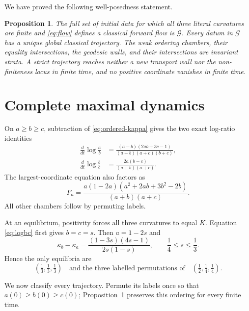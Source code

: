 \documentclass[11pt]{article}
\newtheorem{proposition}[theorem]{Proposition}
\theoremstyle{remark}
\newcommand{\G}{\mathcal G}
\begin{document}
We have proved the following well-posedness statement.

\begin{proposition}\label{prop:wellposed}
The full set of initial data for which all three literal curvatures are finite
and \eqref{eq:flow} defines a classical forward flow is $\G$.  Every datum in
$\G$ has a unique global classical trajectory.  The weak ordering chambers,
their equality intersections, the geodesic walls, and their intersections
are invariant strata.  A strict trajectory reaches neither a new transport
wall nor the non-finiteness locus in finite time, and no positive coordinate
vanishes in finite time.
\end{proposition}

\section{Complete maximal dynamics}

On $a\geq b\geq c$, subtraction of \eqref{eq:ordered-kappa} gives the two
exact log-ratio identities
\begin{align}
 \frac{d}{dt}\log\frac ab
 &=\frac{(a-b)(2ab+3c-1)}{(a+b)(a+c)(b+c)},\label{eq:logab}\\
 \frac{d}{dt}\log\frac bc
 &=\frac{2a(b-c)}{(a+b)(a+c)}.\label{eq:logbc}
\end{align}
The largest-coordinate equation also factors as
\begin{equation}\label{eq:Fa}
 F_a=\frac{a(1-2a)(a^2+2ab+3b^2-2b)}{(a+b)(a+c)}.
\end{equation}
All other chambers follow by permuting labels.

At an equilibrium, positivity forces all three curvatures to equal $K$.
Equation \eqref{eq:logbc} first gives $b=c=s$.  Then $a=1-2s$ and
\begin{equation}\label{eq:eqfactor}
 \kappa_b-\kappa_a=
 \frac{(1-3s)(4s-1)}{2s(1-s)},\qquad \frac14\leq s\leq\frac13.
\end{equation}
Hence the only equilibria are
\begin{equation}\label{eq:equilibria}
 (\tfrac13,\tfrac13,\tfrac13)
 \quad\text{and the three labelled permutations of}\quad
 (\tfrac12,\tfrac14,\tfrac14).
\end{equation}

We now classify every trajectory.  Permute its labels once so that
$a(0)\geq b(0)\geq c(0)$; Proposition~\ref{prop:wellposed} preserves this
ordering for every finite time.
\end{document}
